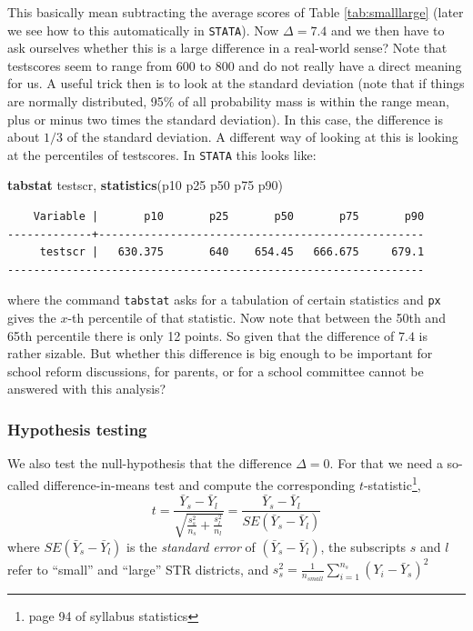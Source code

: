 \documentclass[
]{book}
\newenvironment{Shaded}{\begin{snugshade}}{\end{snugshade}}
\newcommand{\KeywordTok}[1]{\textcolor[rgb]{0.13,0.29,0.53}{\textbf{#1}}}
\newcommand{\NormalTok}[1]{#1}
\begin{document}
This basically mean subtracting the average scores of Table \ref{tab:smalllarge} (later we see how to this automatically in \texttt{STATA}). Now \(\Delta = 7.4\) and we then have to ask ourselves whether this is a large difference in a real-world sense? Note that testscores seem to range from 600 to 800 and do not really have a direct meaning for us. A useful trick then is to look at the standard deviation (note that if things are normally distributed, 95\% of all probability mass is within the range mean, plus or minus two times the standard deviation). In this case, the difference is about \(1/3\) of the standard deviation. A different way of looking at this is looking at the percentiles of testscores. In \texttt{STATA} this looks like:

\begin{Shaded}
\begin{Highlighting}[]
\KeywordTok{tabstat}\NormalTok{ testscr, }\KeywordTok{statistics}\NormalTok{(p10 p25 p50 p75 p90)}
\end{Highlighting}
\end{Shaded}

\begin{verbatim}
    Variable |       p10       p25       p50       p75       p90
-------------+--------------------------------------------------
     testscr |   630.375       640    654.45   666.675     679.1
----------------------------------------------------------------
\end{verbatim}

where the command \texttt{tabstat} asks for a tabulation of certain statistics and \texttt{px} gives the \(x\)-th percentile of that statistic. Now note that between the 50th and 65th percentile there is only 12 points. So given that the difference of \(7.4\) is rather sizable. But whether this difference is big enough to be important for school reform discussions, for parents, or for a school committee cannot be answered with this analysis?

\hypertarget{hypothesis-testing}{%
\subsubsection{Hypothesis testing}\label{hypothesis-testing}}

We also test the null-hypothesis that the difference \(\Delta = 0\). For that we need a so-called difference-in-means test and compute the corresponding \(t\)-statistic\footnote{page 94 of syllabus statistics},
\begin{equation}
t = \frac{\bar{Y}_s - \bar{Y}_l}{\sqrt{\frac{s^2_s}{n_s} +\frac{s^2_l}{n_l} }} = \frac{\bar{Y}_s - \bar{Y}_l}{SE(\bar{Y}_s - \bar{Y}_l)}
\label{eq:testinglarge}
\end{equation}
where \(SE(\bar{Y}_s - \bar{Y}_l)\) is the \emph{standard error} of
\((\bar{Y}_s - \bar{Y}_l)\), the subscripts \(s\) and \(l\) refer to ``small'' and ``large'' STR districts, and \(s_s^2 = \frac{1}{n_{small}}\sum_{i=1}^{n_s}(Y_i - \bar{Y}_s)^2\)
\end{document}
